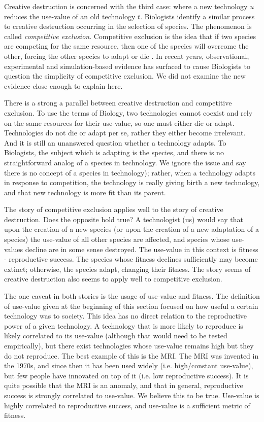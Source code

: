 \documentclass[11pt]{article}
\begin{document}
Creative destruction is concerned with the third case: where a new technology $u$ reduces the use-value of an old technology $t$. 
Biologists identify a similar process to creative destruction occurring in the selection of species. 
The phenomenon is called \textit{competitive exclusion}. 
Competitive exclusion is the idea that if two species are competing for the same resource, then one of the species will overcome the other, forcing the other species to adapt or die \cite{wiki-competitive-exclusion}. 
In recent years, observational, experimental and simulation-based evidence has surfaced to cause Biologists to question the simplicity of competitive exclusion.
We did not examine the new evidence close enough to explain here.

There is a strong a parallel between creative destruction and competitive exclusion.
To use the terms of Biology, two technologies cannot coexist and rely on the same resources for their use-value, so one must either die or adapt. 
Technologies do not die or adapt per se, rather they either become irrelevant.
And it is still an unanswered question whether a technology adapts. 
To Biologists, the subject which is adapting is the species, and there is no straightforward analog of a species in technology. 
We ignore the issue and say there is no concept of a species in technology); rather, when a technology adapts in response to competition, the technology is really giving birth a new technology, and that new technology is more fit than its parent.

The story of competitive exclusion applies well to the story of creative destruction.
Does the opposite hold true?
A technologist (us) would say that upon the creation of a new species (or upon the creation of a new adaptation of a species) the use-value of all other species are affected, and species whose use-values decline are in some sense destroyed. 
The use-value in this context is fitness - reproductive success.
The species whose fitness declines sufficiently may become extinct; otherwise, the species adapt, changing their fitness. 
The story seems of creative destruction also seems to apply well to competitive exclusion.

The one caveat in both stories is the usage of use-value and fitness. 
The definition of use-value given at the beginning of this section focused on how useful a certain technology was to society. 
This idea has no direct relation to the reproductive power of a given technology. 
A technology that is more likely to reproduce is likely correlated to its use-value (although that would need to be tested empirically), but there exist technologies whose use-value remains high but they do not reproduce. 
The best example of this is the MRI.
The MRI was invented in the 1970s, and since then it has been used widely (i.e. high/constant use-value), but few people have innovated on top of it (i.e. low reproductive success). 
It is quite possible that the MRI is an anomaly, and that in general, reproductive success is strongly correlated to use-value. 
We believe this to be true.
Use-value is highly correlated to reproductive success, and use-value is a sufficient metric of fitness.
\end{document}
